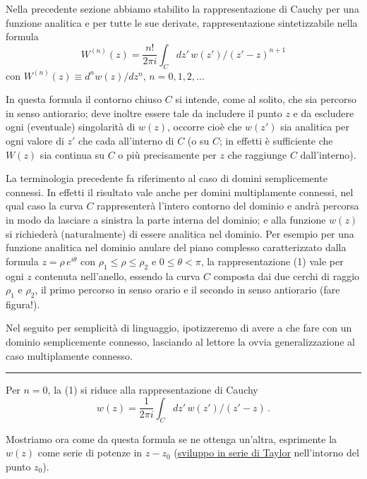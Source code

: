 \documentclass[11pt, a4paper]{book}
\numberwithin{equation}{section}
\begin{document}
Nella precedente sezione abbiamo stabilito la rappresentazione di Cauchy per una funzione analitica e per tutte le sue derivate, rappresentazione sintetizzabile nella formula
\begin{equation}
W^{(n)}(z) = \frac{n!}{2\pi i} \int_C dz'\, w(z') / (z'-z)^{n+1} \tag{1}
\end{equation}
con $W^{(n)}(z) \equiv d^n w(z)/dz^n$, $n = 0, 1, 2, \ldots$

In questa formula il contorno chiuso $C$ si intende, come al solito, che sia percorso in senso antiorario; deve inoltre essere tale da includere il punto $z$ e da escludere ogni (eventuale) singolarità di $w(z)$, occorre cioè che $w(z')$ sia analitica per ogni valore di $z'$ che cada all'interno di $C$ (o su $C$; in effetti è sufficiente che $W(z)$ sia continua su $C$ o più precisamente per $z$ che raggiunge $C$ dall'interno).

\medskip

La terminologia precedente fa riferimento al caso di domini semplicemente connessi. In effetti il risultato vale anche per domini multiplamente connessi, nel qual caso la curva $C$ rappresenterà l'intero contorno del dominio e andrà percorsa in modo da lasciare a sinistra la parte interna del dominio; e alla funzione $w(z)$ si richiederà (naturalmente) di essere analitica nel dominio. Per esempio per una funzione analitica nel dominio anulare del piano complesso caratterizzato dalla formula $z = \rho\, e^{i\theta}$ con $\rho_1 \leq \rho \leq \rho_2$ e $0 \leq \theta < \pi$, la rappresentazione (1) vale per ogni $z$ contenuta nell'anello, essendo la curva $C$ composta dai due cerchi di raggio $\rho_1$ e $\rho_2$, il primo percorso in senso orario e il secondo in senso antiorario (fare figura!).

Nel seguito per semplicità di linguaggio, ipotizzeremo di avere a che fare con un dominio semplicemente connesso, lasciando al lettore la ovvia generalizzazione al caso multiplamente connesso.

\medskip\hrule\medskip

Per $n=0$, la (1) si riduce alla rappresentazione di Cauchy
\begin{equation}
w(z) = \frac{1}{2\pi i} \int_C dz'\, w(z') / (z'-z)\,. \tag{2}
\end{equation}

Mostriamo ora come da questa formula se ne ottenga un'altra, esprimente la $w(z)$ come serie di potenze in $z-z_0$ (\underline{sviluppo in serie di Taylor} nell'intorno del punto $z_0$).
\end{document}
